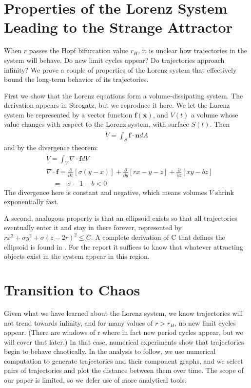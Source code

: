 \documentclass{report}
\begin{document}
\section{Properties of the Lorenz System Leading to the Strange Attractor}

When \(r\) passes the Hopf bifurcation value \(r_H\), it is unclear how
trajectories in the system will behave. Do new limit cycles appear? Do
trajectories approach infinity? We prove a couple of properties of the Lorenz
system that effectively bound the long-term behavior of its trajectories.

First we show that the Lorenz equations form a volume-dissipating system. The
derivation appears in Strogatz\cite{strogatz15}, but we reproduce it here.
We let the Lorenz system be represented by a vector function
\(\boldsymbol{f}(\boldsymbol{x})\), and \(V(t)\) a volume whose value changes
with respect to the Lorenz system, with surface \(S(t)\). Then
\begin{align*}
  \dot{V} = \int_S \boldsymbol{f}\cdot\boldsymbol{n}dA
\end{align*}
and by the divergence theorem:
\begin{align*}
  &\dot{V} = \int_V \nabla\cdot\boldsymbol{f}dV \\
  &\nabla\cdot\boldsymbol{f} = \frac{\partial}{\partial x}[\sigma(y-x)]
+\frac{\partial}{\partial y}[rx-y-z] + \frac{\partial}{\partial z}[xy-bz] \\
  &\quad = -\sigma -1-b < 0 
\end{align*}
The divergence here is constant and negative, which means volumes \(V\) shrink
exponentially fast.

A second, analogous property is that an ellipsoid exists so that all
trajectories eventually enter it and stay in there forever, represented by
\(rx^2 +\sigma y^2+\sigma(z-2r)^2 \leq C\). A complete derivation of C that
defines the ellipsoid is found in \cite{sparrow82}. For the report it suffices
to know that whatever attracting objects exist in the system appear in this
region.

\section{Transition to Chaos}

Given what we have learned about the Lorenz system, we know trajectories will
not trend towards infinity, and for many values of \( r > r_H\), no new limit
cycles appear. (There are windows of r where in fact new period cycles appear,
but we will cover that later.) In that case, numerical experiments show that
trajectories begin to behave chaotically. In the analysis to follow, we use
numerical computation to generate trajectories and their component graphs, and
we select pairs of trajectories and plot the distance between them over time.
The scope of our paper is limited, so we defer use of more analytical tools.
\end{document}
